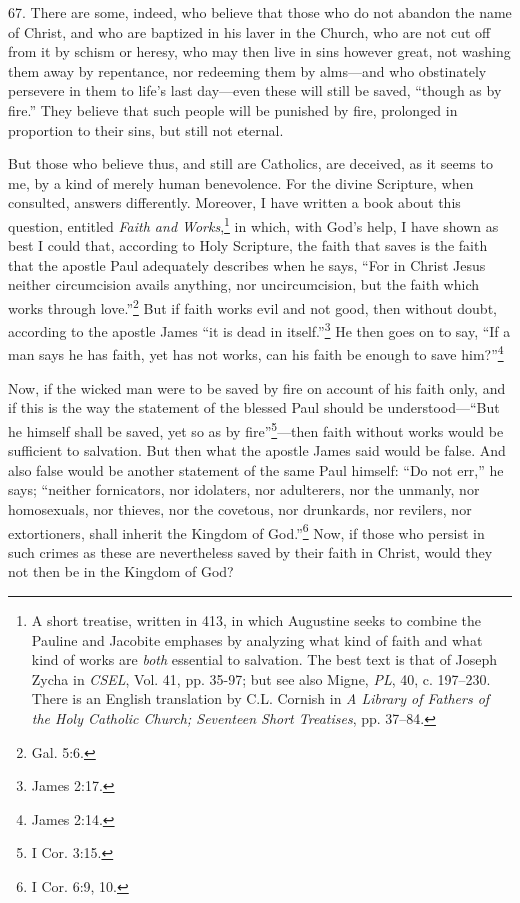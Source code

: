 
67. There are some, indeed, who believe that those who do not abandon the name of Christ, and who are baptized in his laver in the Church, who are not cut off from it by schism or heresy, who may then live in sins however great, not washing them away by repentance, nor redeeming them by alms—and who obstinately persevere in them to life's last day—even these will still be saved, ``though as by fire.'' They believe that such people will be punished by fire, prolonged in proportion to their sins, but still not eternal.

But those who believe thus, and still are Catholics, are deceived, as it seems to me, by a kind of merely human benevolence. For the divine Scripture, when consulted, answers differently. Moreover, I have written a book about this question, entitled \emph{Faith and Works},\footnote{A short treatise, written in 413, in which Augustine seeks to combine the Pauline and Jacobite emphases by analyzing what kind of faith and what kind of works are \emph{both} essential to salvation. The best text is that of Joseph Zycha in \emph{CSEL}, Vol. 41, pp. 35-97; but see also Migne, \emph{PL}, 40, c. 197–230. There is an English translation by C.L. Cornish in \emph{A Library of Fathers of the Holy Catholic Church; Seventeen Short Treatises}, pp. 37–84.} in which, with God's help, I have shown as best I could that, according to Holy Scripture, the faith that saves is the faith that the apostle Paul adequately describes when he says, ``For in Christ Jesus neither circumcision avails anything, nor uncircumcision, but the faith which works through love.''\footnote{Gal. 5:6.} But if faith works evil and not good, then without doubt, according to the apostle James ``it is dead in itself.''\footnote{James 2:17.} He then goes on to say, ``If a man says he has faith, yet has not works, can his faith be enough to save him?''\footnote{James 2:14.}

Now, if the wicked man were to be saved by fire on account of his faith only, and if this is the way the statement of the blessed Paul should be understood—``But he himself shall be saved, yet so as by fire''\footnote{I Cor. 3:15.}—then faith without works would be sufficient to salvation. But then what the apostle James said would be false. And also false would be another statement of the same Paul himself: ``Do not err,'' he says; ``neither fornicators, nor idolaters, nor adulterers, nor the unmanly, nor homosexuals, nor thieves, nor the covetous, nor drunkards, nor revilers, nor extortioners, shall inherit the Kingdom of God.''\footnote{I Cor. 6:9, 10.} Now, if those who persist in such crimes as these are nevertheless saved by their faith in Christ, would they not then be in the Kingdom of God?

